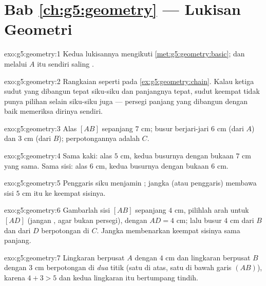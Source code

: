 \section*{Bab \ref{ch:g5:geometry} --- Lukisan Geometri}

\begin{solution}{exo:g5:geometry:1}
Kedua lukisannya mengikuti \cref{met:g5:geometry:basic};  dan  melalui $A$ itu sendiri saling .
\end{solution}

\begin{solution}{exo:g5:geometry:2}
Rangkaian  seperti pada \cref{ex:g5:geometry:chain}.
Kalau ketiga sudut yang dibangun tepat siku-siku dan panjangnya
tepat, sudut keempat tidak punya pilihan selain siku-siku juga ---
persegi panjang yang dibangun dengan baik memeriksa dirinya sendiri.
\end{solution}

\begin{solution}{exo:g5:geometry:3}
Alas $[AB]$ sepanjang $7$ cm; busur berjari-jari $6$ cm (dari $A$)
dan $3$ cm (dari $B$); perpotongannya adalah $C$.
\end{solution}

\begin{solution}{exo:g5:geometry:4}
Sama kaki: alas $5$ cm, kedua busurnya dengan bukaan $7$ cm yang
sama. Sama sisi: alas $6$ cm, kedua busurnya dengan bukaan $6$ cm.
\end{solution}

\begin{solution}{exo:g5:geometry:5}
Penggaris siku menjamin ; jangka (atau penggaris)
membawa sisi $5$ cm itu ke keempat sisinya.
\end{solution}

\begin{solution}{exo:g5:geometry:6}
Gambarlah sisi $[AB]$ sepanjang $4$ cm, pilihlah arah untuk $[AD]$
(jangan , agar bukan persegi), dengan $AD = 4$ cm; lalu
busur $4$ cm dari $B$ dan dari $D$ berpotongan di $C$. Jangka
membenarkan keempat sisinya sama panjang.
\end{solution}

\begin{solution}{exo:g5:geometry:7}
Lingkaran berpusat $A$ dengan  $4$ cm dan lingkaran
berpusat $B$ dengan  $3$ cm berpotongan di \emph{dua} titik
(satu di atas, satu di bawah garis $(AB)$), karena $4 + 3 > 5$ dan kedua lingkaran itu bertumpang tindih.
\end{solution}


